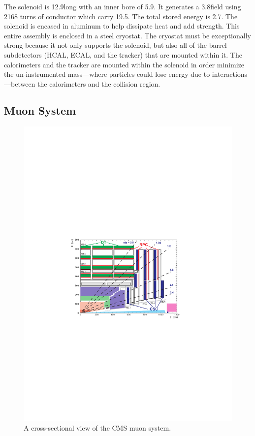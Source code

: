 The solenoid is 12.9\meters long with an inner bore of 5.9\meters. It generates
a 3.8\tesla field using 2168 turns of conductor which carry 19.5\kiloamps. The
total stored energy is 2.7\gigajoules. The solenoid is encased in aluminum to
help dissipate heat and add strength. This entire assembly is enclosed in a
steel cryostat. The cryostat must be exceptionally strong because it not only
supports the solenoid, but also all of the barrel subdetectors (HCAL, ECAL, and
the tracker) that are mounted within it. The calorimeters and the tracker are
mounted within the solenoid in order minimize the un-instrumented mass---where
particles could lose energy due to interactions---between the calorimeters and
the collision region.

\subsection{Muon System}

\begin{figure}[tb]
    \centering
    \includegraphics[width=\textwidth]{figures/muon_layout.pdf}
    \caption{A cross-sectional view of the CMS muon system.}
    \label{fig:muon_layout}
\end{figure}

